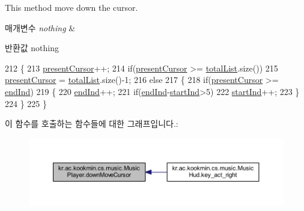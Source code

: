 This method move down the cursor. 


\begin{DoxyParams}{매개변수}
{\em nothing} & \\
\hline
\end{DoxyParams}
\begin{DoxyReturn}{반환값}
nothing 
\end{DoxyReturn}

\begin{DoxyCode}
212   \{
213     \hyperlink{classkr_1_1ac_1_1kookmin_1_1cs_1_1music_1_1_music_player_aed823f56c3e5597d294d4f66a2d2fc54}{presentCursor}++;
214     \textcolor{keywordflow}{if}(\hyperlink{classkr_1_1ac_1_1kookmin_1_1cs_1_1music_1_1_music_player_aed823f56c3e5597d294d4f66a2d2fc54}{presentCursor} >= \hyperlink{classkr_1_1ac_1_1kookmin_1_1cs_1_1music_1_1_music_player_ac7599b9b64999c9fcb1b7f1e6d32d188}{totalList}.size())
215       \hyperlink{classkr_1_1ac_1_1kookmin_1_1cs_1_1music_1_1_music_player_aed823f56c3e5597d294d4f66a2d2fc54}{presentCursor} = \hyperlink{classkr_1_1ac_1_1kookmin_1_1cs_1_1music_1_1_music_player_ac7599b9b64999c9fcb1b7f1e6d32d188}{totalList}.size()-1;
216     \textcolor{keywordflow}{else}
217     \{
218       \textcolor{keywordflow}{if}(\hyperlink{classkr_1_1ac_1_1kookmin_1_1cs_1_1music_1_1_music_player_aed823f56c3e5597d294d4f66a2d2fc54}{presentCursor} >= \hyperlink{classkr_1_1ac_1_1kookmin_1_1cs_1_1music_1_1_music_player_ad162359e29d80d26914c27b6318901eb}{endInd})
219       \{
220         \hyperlink{classkr_1_1ac_1_1kookmin_1_1cs_1_1music_1_1_music_player_ad162359e29d80d26914c27b6318901eb}{endInd}++;
221         \textcolor{keywordflow}{if}(\hyperlink{classkr_1_1ac_1_1kookmin_1_1cs_1_1music_1_1_music_player_ad162359e29d80d26914c27b6318901eb}{endInd}-\hyperlink{classkr_1_1ac_1_1kookmin_1_1cs_1_1music_1_1_music_player_af154b8f09fc298427ccfb1d0e7c94447}{startInd}>5)
222           \hyperlink{classkr_1_1ac_1_1kookmin_1_1cs_1_1music_1_1_music_player_af154b8f09fc298427ccfb1d0e7c94447}{startInd}++;
223       \}
224     \}
225   \}
\end{DoxyCode}


이 함수를 호출하는 함수들에 대한 그래프입니다.\+:\nopagebreak
\begin{figure}[H]
\begin{center}
\leavevmode
\includegraphics[width=350pt]{classkr_1_1ac_1_1kookmin_1_1cs_1_1music_1_1_music_player_a6c1889cdb80e7b51c8f05f0296c9e28a_icgraph}
\end{center}
\end{figure}


